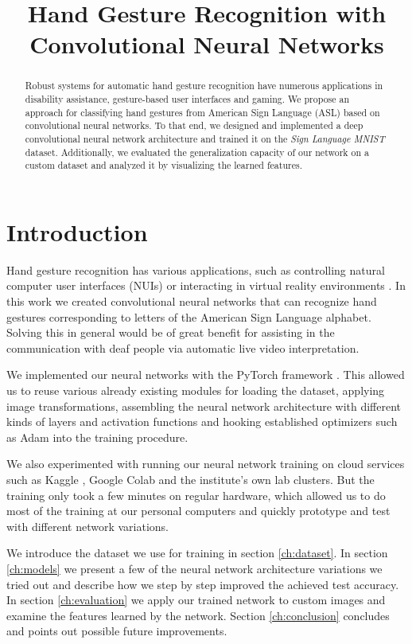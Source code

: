 \documentclass[a4paper]{article}
\title{Hand Gesture Recognition with Convolutional Neural Networks}
\begin{document}
\maketitle
%
\begin{abstract}
Robust systems for automatic hand gesture recognition have numerous applications in disability assistance, gesture-based user interfaces and gaming. We propose an approach for classifying hand gestures from American Sign Language (ASL) based on convolutional neural networks. To that end, we designed and implemented a deep convolutional neural network architecture and trained it on the \textit{Sign Language MNIST} dataset. Additionally, we evaluated the generalization capacity of our network on a custom dataset and analyzed it by visualizing the learned features.
\end{abstract}

\section{Introduction}

Hand gesture recognition has various applications, such as controlling natural computer user interfaces (NUIs) \cite{GlueTK} or interacting in virtual reality environments \cite{MicrosoftTalkingHands}. In this work we created convolutional neural networks that can recognize hand gestures corresponding to letters of the American Sign Language alphabet. Solving this in general would be of great benefit for assisting in the communication with deaf people via automatic live video interpretation.

We implemented our neural networks with the PyTorch framework \cite{PyTorch}. This allowed us to reuse various already existing modules for loading the dataset, applying image transformations, assembling the neural network architecture with different kinds of layers and activation functions and hooking established optimizers such as Adam \cite{Kingma2014} into the training procedure.

We also experimented with running our neural network training on cloud services such as Kaggle \cite{Kaggle}, Google Colab \cite{Colab} and the institute's own lab clusters. But the training only took a few minutes on regular hardware, which allowed us to do most of the training at our personal computers and quickly prototype and test with different network variations.

We introduce the dataset we use for training in section \ref{ch:dataset}. In section \ref{ch:models} we present a few of the neural network architecture variations we tried out and describe how we step by step improved the achieved test accuracy. In section \ref{ch:evaluation} we apply our trained network to custom images and examine the features learned by the network. Section \ref{ch:conclusion} concludes and points out possible future improvements.
\end{document}
